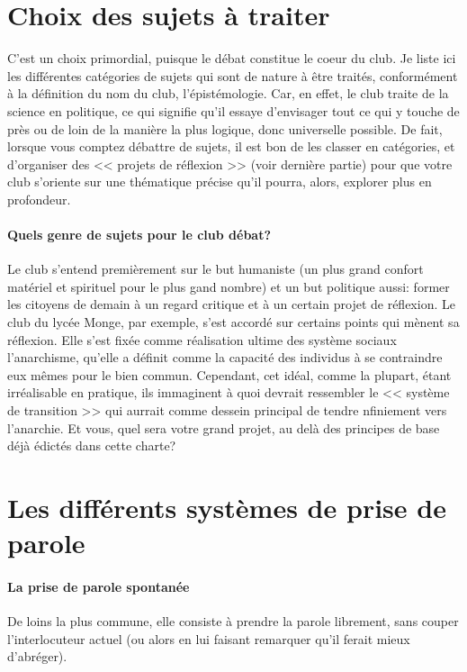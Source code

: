 \documentclass[a4paper,12pt]{article}
\begin{document}
\section{Choix des sujets à traiter}
C'est un choix primordial, puisque le débat constitue le coeur du club. Je liste ici les différentes catégories de sujets qui sont de nature à être traités, conformément à la définition du nom du club, l'épistémologie. Car, en effet, le club traite de la science en politique, ce qui signifie qu'il essaye d'envisager tout ce qui y touche de près ou de loin de la manière la plus logique, donc universelle possible. De fait, lorsque vous comptez débattre de sujets, il est bon de les classer en catégories, et d'organiser des << projets de réflexion >> (voir dernière partie) pour que votre club s'oriente sur une thématique précise qu'il pourra, alors, explorer plus en profondeur.

\paragraph{Quels genre de sujets pour le club débat?}
Le club s'entend premièrement sur le but humaniste (un plus grand confort matériel et spirituel pour le plus gand nombre) et un but politique aussi: former les citoyens de demain à un regard critique et à un certain projet de réflexion. Le club du lycée Monge, par exemple, s'est accordé sur certains points qui mènent sa réflexion. Elle s'est fixée comme réalisation ultime des système sociaux l'anarchisme, qu'elle a définit comme la capacité des individus à se contraindre eux mêmes pour le bien commun. Cependant, cet idéal, comme la plupart, étant irréalisable en pratique, ils immaginent à quoi devrait ressembler le << système de transition >> qui aurrait comme dessein principal de tendre nfiniement vers l'anarchie. Et vous, quel sera votre grand projet, au delà des principes de base déjà édictés dans cette charte?

\section{Les différents systèmes de prise de parole}
\paragraph{La prise de parole spontanée}
De loins la plus commune, elle consiste à prendre la parole librement, sans couper l'interlocuteur actuel (ou alors en lui faisant remarquer qu'il ferait mieux d'abréger).
\end{document}
